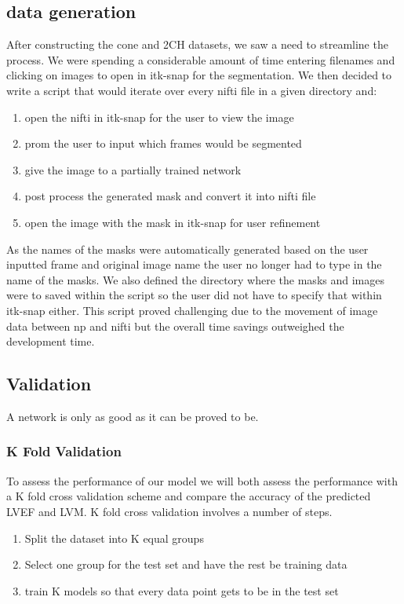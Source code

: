 \documentclass[12pt]{article}
\begin{document}
\subsection{data generation}
After constructing the cone and 2CH datasets, we saw a need to streamline the process. 
We were spending a considerable amount of time entering filenames and clicking on images to open in itk-snap for the segmentation.
We then decided to write a script that would iterate over every nifti file in a given directory and:
\begin{enumerate}
	\item{open the nifti in itk-snap for the user to view the image}
	\item{prom the user to input which frames would be segmented}
	\item{give the image to a partially trained network}
	\item{post process the generated mask and convert it into nifti file}
	\item{open the image with the mask in itk-snap for user refinement}
\end{enumerate}
As the names of the masks were automatically generated based on the user inputted frame and original image name the user no longer had to type in the name of the masks.
We also defined the directory where the masks and images were to saved within the script so the user did not have to specify that within itk-snap either.
This script proved challenging due to the movement of image data between np and nifti but the overall time savings outweighed the development time.


\subsection{Validation}
A network is only as good as it can be proved to be.
\subsubsection{K Fold Validation}
To assess the performance of our model we will both assess the performance with a K fold cross validation scheme and compare the accuracy of the predicted LVEF and LVM.
K fold cross validation involves a number of steps.

\begin{enumerate}
	\item{Split the dataset into K equal groups}
	\item{Select one group for the test set and have the rest be training data}
	\item{train K models so that every data point gets to be in the test set}
\end{enumerate}
\end{document}
